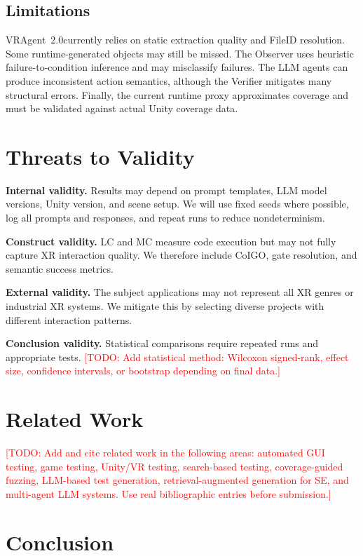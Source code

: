 \documentclass[10pt,conference]{IEEEtran}
\newcommand{\todo}[1]{\textcolor{red}{[TODO: #1]}}
\newcommand{\tool}{VRAgent~2.0}
\begin{document}
\subsection{Limitations}

\tool currently relies on static extraction quality and FileID resolution. Some
runtime-generated objects may still be missed. The Observer uses heuristic
failure-to-condition inference and may misclassify failures. The LLM agents can
produce inconsistent action semantics, although the Verifier mitigates many
structural errors. Finally, the current runtime proxy approximates coverage and
must be validated against actual Unity coverage data.

\section{Threats to Validity}

\textbf{Internal validity.} Results may depend on prompt templates, LLM model
versions, Unity version, and scene setup. We will use fixed seeds where possible,
log all prompts and responses, and repeat runs to reduce nondeterminism.

\textbf{Construct validity.} LC and MC measure code execution but may not fully
capture XR interaction quality. We therefore include CoIGO, gate resolution, and
semantic success metrics.

\textbf{External validity.} The subject applications may not represent all XR
genres or industrial XR systems. We mitigate this by selecting diverse projects
with different interaction patterns.

\textbf{Conclusion validity.} Statistical comparisons require repeated runs and
appropriate tests. \todo{Add statistical method: Wilcoxon signed-rank, effect
size, confidence intervals, or bootstrap depending on final data.}

\section{Related Work}

\todo{Add and cite related work in the following areas: automated GUI testing,
game testing, Unity/VR testing, search-based testing, coverage-guided fuzzing,
LLM-based test generation, retrieval-augmented generation for SE, and multi-agent
LLM systems. Use real bibliographic entries before submission.}

\section{Conclusion}
\end{document}
